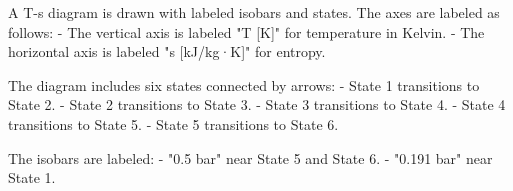 A T-s diagram is drawn with labeled isobars and states. The axes are labeled as follows:  
- The vertical axis is labeled "T [K]" for temperature in Kelvin.  
- The horizontal axis is labeled "s [kJ/kg·K]" for entropy.  

The diagram includes six states connected by arrows:  
- State 1 transitions to State 2.  
- State 2 transitions to State 3.  
- State 3 transitions to State 4.  
- State 4 transitions to State 5.  
- State 5 transitions to State 6.  

The isobars are labeled:  
- "0.5 bar" near State 5 and State 6.  
- "0.191 bar" near State 1.